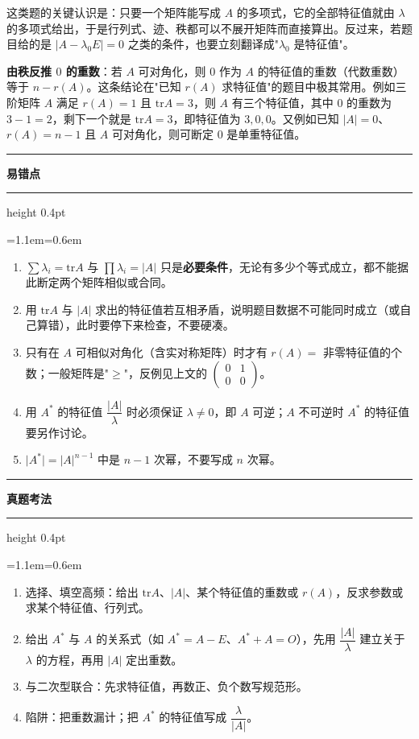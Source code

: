 \documentclass[11pt,openany,UTF8]{ctexbook}
\newcommand{\callouthead}[2]{%
  \par\addvspace{7pt}\noindent
  {\color{#1}\rule[-0.15em]{3pt}{1.05em}}\hspace{0.5em}%
  {\bfseries\color{#1}#2}\par\nobreak\vspace{-0.35em}%
  {\color{rulesep}\hrule height 0.4pt}\nobreak\vspace{0.45em}%
  \begingroup\small\setlength{\parindent}{0pt}%
  \leftskip=1.1em\rightskip=0.6em\noindent\ignorespaces}
\newcommand{\calloutend}{\par\endgroup\addvspace{7pt}}
\newenvironment{callwarn}[1]{\callouthead{warnbar}{#1}}{\calloutend}
\newenvironment{callexam}[1]{\callouthead{exambar}{#1}}{\calloutend}
\begin{document}
这类题的关键认识是：只要一个矩阵能写成 $A$ 的多项式，它的全部特征值就由 $\lambda$ 的多项式给出，于是行列式、迹、秩都可以不展开矩阵而直接算出。反过来，若题目给的是 $\vert A-\lambda_0E\vert=0$ 之类的条件，也要立刻翻译成"$\lambda_0$ 是特征值"。

\textbf{由秩反推 $0$ 的重数}：若 $A$ 可对角化，则 $0$ 作为 $A$ 的特征值的重数（代数重数）等于 $n-r(A)$。这条结论在"已知 $r(A)$ 求特征值"的题目中极其常用。例如三阶矩阵 $A$ 满足 $r(A)=1$ 且 $\mathrm{tr}A=3$，则 $A$ 有三个特征值，其中 $0$ 的重数为 $3-1=2$，剩下一个就是 $\mathrm{tr}A=3$，即特征值为 $3,0,0$。又例如已知 $\vert A\vert=0$、$r(A)=n-1$ 且 $A$ 可对角化，则可断定 $0$ 是单重特征值。

\begin{callwarn}{易错点}
\begin{enumerate}
\item $\sum\lambda_i=\mathrm{tr}A$ 与 $\prod\lambda_i=\vert A\vert$ 只是\textbf{必要条件}，无论有多少个等式成立，都不能据此断定两个矩阵相似或合同。
\item 用 $\mathrm{tr}A$ 与 $\vert A\vert$ 求出的特征值若互相矛盾，说明题目数据不可能同时成立（或自己算错），此时要停下来检查，不要硬凑。
\item 只有在 $A$ 可相似对角化（含实对称矩阵）时才有 $r(A)=$ 非零特征值的个数；一般矩阵是"$\geq$"，反例见上文的 $\begin{pmatrix}0&1\\0&0\end{pmatrix}$。
\item 用 $A^*$ 的特征值 $\dfrac{\vert A\vert}{\lambda}$ 时必须保证 $\lambda\neq0$，即 $A$ 可逆；$A$ 不可逆时 $A^*$ 的特征值要另作讨论。
\item $\vert A^*\vert=\vert A\vert^{n-1}$ 中是 $n-1$ 次幂，不要写成 $n$ 次幂。
\end{enumerate}
\end{callwarn}

\begin{callexam}{真题考法}
\begin{enumerate}
\item 选择、填空高频：给出 $\mathrm{tr}A$、$\vert A\vert$、某个特征值的重数或 $r(A)$，反求参数或求某个特征值、行列式。
\item 给出 $A^*$ 与 $A$ 的关系式（如 $A^*=A-E$、$A^*+A=O$），先用 $\dfrac{\vert A\vert}{\lambda}$ 建立关于 $\lambda$ 的方程，再用 $\vert A\vert$ 定出重数。
\item 与二次型联合：先求特征值，再数正、负个数写规范形。
\item 陷阱：把重数漏计；把 $A^*$ 的特征值写成 $\dfrac{\lambda}{\vert A\vert}$。
\end{enumerate}
\end{callexam}
\end{document}
